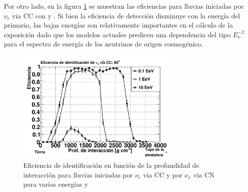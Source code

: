 	Por otro lado, en la figura \ref{fig:effDG_en} se muestran las eficiencias para lluvias iniciadas por $\nu_e$ via CC con  y .
	Si bien la eficiencia de detección disminuye con la energía del primario, las bajas energías son relativamente importantes en el cálculo de la exposición dado que los modelos actuales predicen una dependencia del tipo $E_\nu^{-2}$ para el espectro de energía de los neutrinos de origen cosmogénico.
	\begin{figure}[h!]
		\begin{center}
			\includegraphics[width=0.7\textwidth]{fig/resultadosAuger/eff_varios_85}
			\caption{Eficiencia de identificación en función de la profundidad de interacción para lluvias iniciadas por $\nu_e$ via CC y por $\nu_x$ via CN para varias energías y }
			\label{fig:effDG_en}
		\end{center}
	\end{figure}
	
